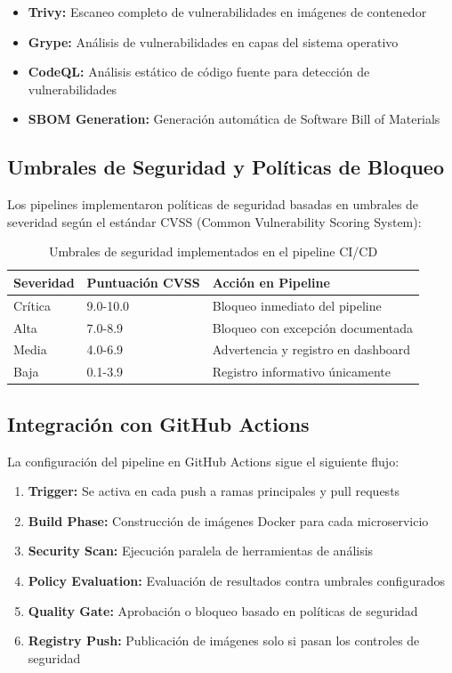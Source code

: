 \documentclass[journal]{IEEEtran}
\begin{document}
\begin{itemize}
    \item \textbf{Trivy:} Escaneo completo de vulnerabilidades en imágenes de contenedor
    \item \textbf{Grype:} Análisis de vulnerabilidades en capas del sistema operativo
    \item \textbf{CodeQL:} Análisis estático de código fuente para detección de vulnerabilidades
    \item \textbf{SBOM Generation:} Generación automática de Software Bill of Materials
\end{itemize}

\subsection{Umbrales de Seguridad y Políticas de Bloqueo}

Los pipelines implementaron políticas de seguridad basadas en umbrales de severidad según el estándar CVSS (Common Vulnerability Scoring System):

\begin{table}[h]
\centering
\begin{tabular}{|l|l|l|}
\hline
\textbf{Severidad} & \textbf{Puntuación CVSS} & \textbf{Acción en Pipeline} \\
\hline
Crítica & 9.0-10.0 & Bloqueo inmediato del pipeline \\
\hline
Alta & 7.0-8.9 & Bloqueo con excepción documentada \\
\hline
Media & 4.0-6.9 & Advertencia y registro en dashboard \\
\hline
Baja & 0.1-3.9 & Registro informativo únicamente \\
\hline
\end{tabular}
\caption{Umbrales de seguridad implementados en el pipeline CI/CD}
\label{tab:umbrales}
\end{table}

\subsection{Integración con GitHub Actions}

La configuración del pipeline en GitHub Actions sigue el siguiente flujo:

\begin{enumerate}
    \item \textbf{Trigger:} Se activa en cada push a ramas principales y pull requests
    \item \textbf{Build Phase:} Construcción de imágenes Docker para cada microservicio
    \item \textbf{Security Scan:} Ejecución paralela de herramientas de análisis
    \item \textbf{Policy Evaluation:} Evaluación de resultados contra umbrales configurados
    \item \textbf{Quality Gate:} Aprobación o bloqueo basado en políticas de seguridad
    \item \textbf{Registry Push:} Publicación de imágenes solo si pasan los controles de seguridad
\end{enumerate}
\end{document}
